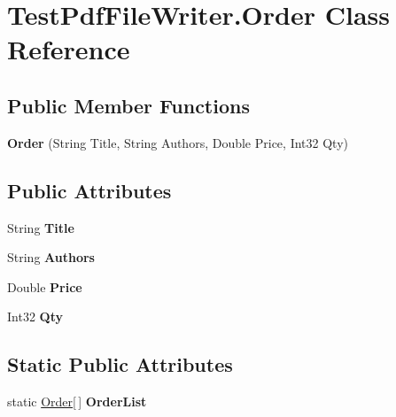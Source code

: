 \hypertarget{class_test_pdf_file_writer_1_1_order}{}\section{Test\+Pdf\+File\+Writer.\+Order Class Reference}
\label{class_test_pdf_file_writer_1_1_order}
\subsection*{Public Member Functions}
\begin{DoxyCompactItemize}
\item 
{\bfseries Order} (String Title, String Authors, Double Price, Int32 Qty)\hypertarget{class_test_pdf_file_writer_1_1_order_a55da9b9db930d0c3c609ba343243ce5b}{}\label{class_test_pdf_file_writer_1_1_order_a55da9b9db930d0c3c609ba343243ce5b}

\end{DoxyCompactItemize}
\subsection*{Public Attributes}
\begin{DoxyCompactItemize}
\item 
String {\bfseries Title}\hypertarget{class_test_pdf_file_writer_1_1_order_a23033b7af4541902e3f68bf651855014}{}\label{class_test_pdf_file_writer_1_1_order_a23033b7af4541902e3f68bf651855014}

\item 
String {\bfseries Authors}\hypertarget{class_test_pdf_file_writer_1_1_order_a91731dabec1272a2b1671fd71981421b}{}\label{class_test_pdf_file_writer_1_1_order_a91731dabec1272a2b1671fd71981421b}

\item 
Double {\bfseries Price}\hypertarget{class_test_pdf_file_writer_1_1_order_a07ee364662651f669d907441a8fa9599}{}\label{class_test_pdf_file_writer_1_1_order_a07ee364662651f669d907441a8fa9599}

\item 
Int32 {\bfseries Qty}\hypertarget{class_test_pdf_file_writer_1_1_order_a21817954dce6ce950ac0c37a513a2e4f}{}\label{class_test_pdf_file_writer_1_1_order_a21817954dce6ce950ac0c37a513a2e4f}

\end{DoxyCompactItemize}
\subsection*{Static Public Attributes}
\begin{DoxyCompactItemize}
\item 
static \hyperlink{class_test_pdf_file_writer_1_1_order}{Order}\mbox{[}$\,$\mbox{]} {\bfseries Order\+List}
\end{DoxyCompactItemize}
